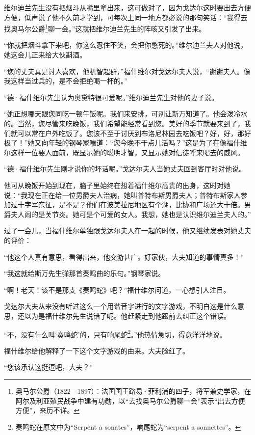 \par 维尔迪兰先生没有把烟斗从嘴里拿出来，这可做对了，因为戈达尔这时要出去方便方便，低声说了他不久前才学到，可每次上同一地方都必说的那句笑话：“我得去找奥马尔公爵\footnote{奥马尔公爵（1822—1897）：法国国王路易·菲利浦的四子，将军兼史学家，在阿尔及利亚殖民战争中建有功勋，以“去找奥马尔公爵聊一会”表示“出去方便方便”，来历不详。}聊一会。”这就把维尔迪兰先生的阵咳又引发了出来。
\par “你就把烟斗拿下来吧，你这么忍住不笑，会把你憋死的。”维尔迪兰夫人对他说，她这会儿正来给大伙斟酒。
\par “您的丈夫真是讨人喜欢，他机智超群，”福什维尔对戈达尔夫人说，“谢谢夫人。像我这样当过兵的，是不会拒绝喝一杯的。”
\par “德·福什维尔先生认为奥黛特很可爱呢。”维尔迪兰先生对他的妻子说。
\par “她正想哪天跟您同吃一顿午饭呢。我们来安排，可别让斯万知道了。他会泼冷水的。当然，您尽管来吃晚饭，我们希望能经常看到您。美好的季节就要来到了，我们就可以常在户外吃饭了。您该不至于讨厌到布洛尼林园去吃饭吧？好，好，那好极了！”她又向年轻的钢琴家嚷道：“您今晚不干点儿活吗？”这是为了在像福什维尔这样一位要人面前，既显示她的聪明才智，又显示她对信徒呼来喝去的威风。
\par “德·福什维尔先生刚才说你的坏话呢。”戈达尔夫人当她丈夫回到客厅时对他说。
\par 他可从晚饭开始到现在，脑子里始终在想着福什维尔高贵的出身，这时对她说：“我现在正在给一位男爵夫人治病，她叫普特布斯男爵夫人；普特布斯家人参加过十字军东征，是不是？他们在波美拉尼地区有个湖，比协和广场还大十倍。男爵夫人闹的是关节炎。她可是个可爱的女人。我想，她也是认识维尔迪兰夫人的。”
\par 过了一会儿，当福什维尔单独跟戈达尔夫人在一起的时候，他又继续发表对她丈夫的评价：
\par “他这个人真有意思，看得出来，他交游甚广。好家伙，大夫知道的事情真多！”
\par “我这就给斯万先生弹那首奏鸣曲的乐句。”钢琴家说。
\par “啊！老天！该不是那支《奏鸣蛇》吧？”福什维尔问道，一心想引人注目。
\par 戈达尔大夫从来没有听过这么一个用谐音字进行的文字游戏，不明白这是什么意思，还以为是福什维尔先生说错了呢。他赶紧走到他跟前去纠正这个错误。
\par “不，没有什么叫‘奏鸣蛇’的，只有响尾蛇\footnote{奏鸣蛇在原文中为“Serpent a sonates”，响尾蛇为“serpent a sonnettes”。}。”他热情急切，得意洋洋地说。
\par 福什维尔给他解释了一下这个文字游戏的由来。大夫脸红了。
\par “您该承认这挺逗吧，大夫？”
